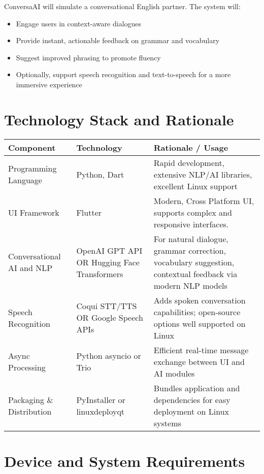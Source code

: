\documentclass[12pt]{article}
\begin{document}
ConversaAI will simulate a conversational English partner. The system will:
\begin{itemize}
    \item Engage users in context-aware dialogues
    \item Provide instant, actionable feedback on grammar and vocabulary
    \item Suggest improved phrasing to promote fluency
    \item Optionally, support speech recognition and text-to-speech for a more immersive experience
\end{itemize}

\section*{Technology Stack and Rationale}

\begin{tabular}{|p{4cm}|p{6cm}|p{4cm}|}
\hline
\textbf{Component} & \textbf{Technology} & \textbf{Rationale / Usage} \\
\hline
Programming Language & Python, Dart & Rapid development, extensive NLP/AI libraries, excellent Linux support \\
\hline
UI Framework & Flutter & Modern, Cross Platform UI, supports complex and responsive interfaces.\\
\hline
Conversational AI and NLP & OpenAI GPT API \newline OR Hugging Face Transformers & For natural dialogue, grammar correction, vocabulary suggestion, contextual feedback via modern NLP models \\
\hline
Speech Recognition & Coqui STT/TTS \newline OR Google Speech APIs & Adds spoken conversation capabilities; open-source options well supported on Linux \\
\hline
Async Processing & Python asyncio \newline or Trio & Efficient real-time message exchange between UI and AI modules \\
\hline
Packaging \& Distribution & PyInstaller \newline or linuxdeployqt & Bundles application and dependencies for easy deployment on Linux systems \\
\hline
\end{tabular}

\section*{Device and System Requirements}
\end{document}
